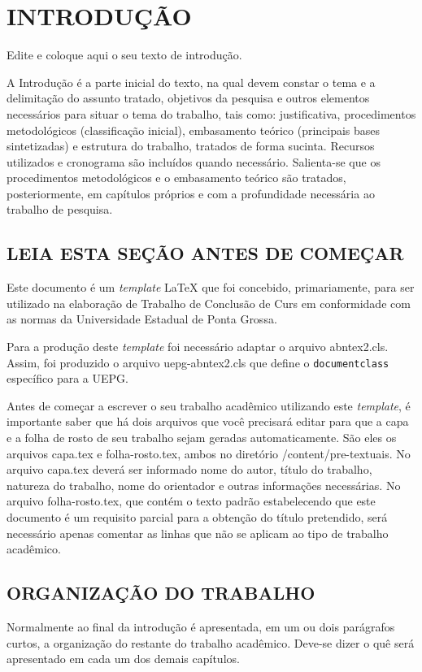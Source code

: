 
\chapter{INTRODUÇÃO}
\label{chap:introducao}

Edite e coloque aqui o seu texto de introdução.

A Introdução é a parte inicial do texto, na qual devem constar o tema e a delimitação do assunto tratado, objetivos da pesquisa e outros elementos necessários para situar o tema do trabalho, tais como: justificativa, procedimentos metodológicos (classificação inicial), embasamento teórico (principais bases sintetizadas) e estrutura do trabalho, tratados de forma sucinta. Recursos utilizados e cronograma são incluídos quando necessário. Salienta-se que os procedimentos metodológicos e o embasamento teórico são tratados, posteriormente, em capítulos próprios e com a profundidade necessária ao trabalho de pesquisa.

\section{LEIA ESTA SEÇÃO ANTES DE COMEÇAR}
\label{sec:antesleiame}

Este documento é um \emph{template} \LaTeX{} que foi concebido, primariamente, para ser utilizado na elaboração de Trabalho de Conclusão de Curs em conformidade com as normas da Universidade Estadual de Ponta Grossa.

Para a produção deste \emph{template} foi necessário adaptar o arquivo {\ttfamily abntex2.cls}. Assim, foi produzido o arquivo {\ttfamily uepg-abntex2.cls} que define o \verb|documentclass| específico para a UEPG.

Antes de começar a escrever o seu trabalho acadêmico utilizando este \emph{template}, é importante saber que há dois arquivos que você precisará editar para que a capa e a folha de rosto de seu trabalho sejam geradas automaticamente.
São eles os arquivos {\ttfamily capa.tex} e {\ttfamily folha-rosto.tex}, ambos no diretório  {\ttfamily /content/pre-textuais}.
No arquivo {\ttfamily capa.tex} deverá ser informado nome do autor, título do trabalho, natureza do trabalho, nome do orientador e outras informações necessárias.
No arquivo {\ttfamily folha-rosto.tex}, que contém o texto padrão estabelecendo que este documento é um requisito parcial para a obtenção do título pretendido, será necessário apenas comentar as linhas que não se aplicam ao tipo de trabalho acadêmico.


\section{ORGANIZAÇÃO DO TRABALHO}
\label{sec:organizacaoTrabalho}

Normalmente ao final da introdução é apresentada, em um ou dois parágrafos curtos, a organização do restante do trabalho acadêmico.
Deve-se dizer o quê será apresentado em cada um dos demais capítulos.
